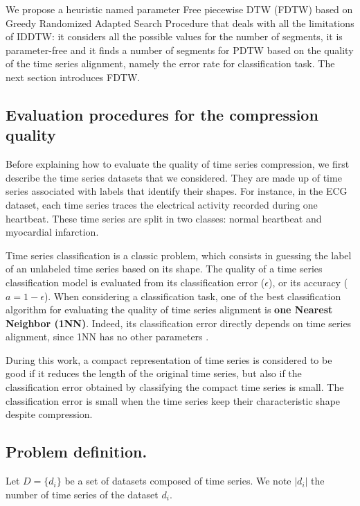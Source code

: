 We propose a  heuristic named parameter Free piecewise DTW (FDTW) based on Greedy Randomized Adapted Search Procedure that deals with all the limitations of IDDTW: it considers all the possible values for the number of segments, it is parameter-free and it finds a number of segments for PDTW based on the quality of  the time series alignment, namely the error rate for classification task. The next section introduces FDTW.

\subsection{ Evaluation procedures for the compression quality}
Before explaining how to evaluate the quality of time series compression, we
first describe the time series datasets that we considered. They are
made up of time series associated with labels that identify their shapes. For instance, in the ECG dataset, each time series traces the
electrical activity recorded during one heartbeat. These time series are split in two classes: normal heartbeat and myocardial infarction. 

 Time series classification is a classic problem, which consists in guessing the label of an unlabeled time series  based on its shape.
The quality of a time series classification model is evaluated from its classification error ($\epsilon$), or its accuracy ($a = 1 - \epsilon$).  When considering a classification task, one of the
best classification algorithm  for evaluating the quality of time series
alignment is \textbf{one Nearest Neighbor (1NN)}. Indeed,  its classification
error directly depends on time series alignment, since 1NN has no other parameters \cite{wang2013experimental}.

During this work, a compact representation of time series  is considered to be good
if it reduces the length of the original time series, but also if the classification error
obtained by classifying the compact time series is small. The classification error is small
when the time series keep their characteristic shape despite compression.   



\subsection{Problem definition.}

Let $D = \{d_i\}$ be a set of datasets composed of time series. We note
$|d_i|$ the number of time series of the dataset $d_i$.

